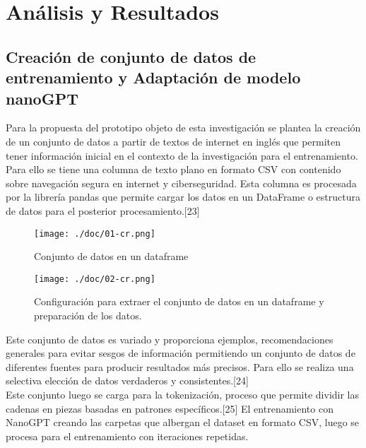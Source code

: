 \chapter{Análisis y Resultados}\label{cap:capitulo4}

\section{Creación de conjunto de datos de entrenamiento y Adaptación de modelo nanoGPT}\label{section:Creación de conjunto de datos con fuentes de internet} 
Para la propuesta del prototipo objeto de esta investigación se plantea la creación de un conjunto de datos a partir de textos de internet en inglés que permiten tener información inicial en el contexto de la investigación para el entrenamiento. Para ello se tiene una columna de texto plano en formato CSV con contenido sobre navegación segura en internet y ciberseguridad. Esta columna es procesada por la librería pandas que permite cargar los datos en un DataFrame o estructura de datos para el posterior procesamiento.[23] \\
\begin{figure}[H]
   \centering %
       \texttt{[image: ./doc/01-cr.png]} 
   \caption{Conjunto de datos en un dataframe  \cite{}}
  \label{figure:Resultado 1}  %
\end{figure}
\begin{figure}[H]
   \centering %
       \texttt{[image: ./doc/02-cr.png]} 
   \caption{Configuración para extraer el conjunto de datos en un dataframe y preparación de los datos.  \cite{}}
  \label{figure:Resultado 1}  %
\end{figure}

Este conjunto de datos es variado y proporciona ejemplos, recomendaciones generales para evitar sesgos de información permitiendo un conjunto de datos de diferentes fuentes para producir resultados más precisos. Para ello se realiza una selectiva elección de datos verdaderos y consistentes.[24] \\
Este conjunto luego se carga para la tokenización, proceso que permite dividir las cadenas en piezas basadas en patrones específicos.[25] El entrenamiento con NanoGPT creando las carpetas que albergan el dataset en formato CSV, luego se procesa para el entrenamiento con iteraciones repetidas. \\

